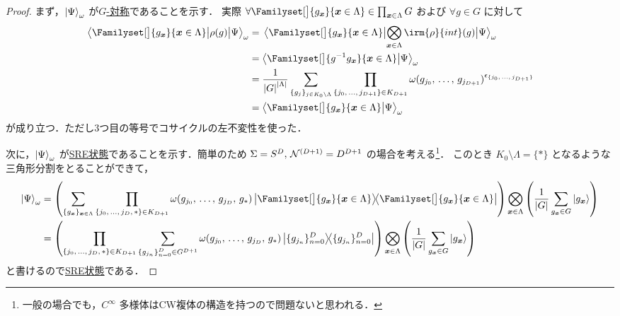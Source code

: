 \documentclass[TQFT_main]{subfiles}
\begin{document}
\begin{proof}
    まず，$\ket{\Psi}_\omega$ が\hyperref[def:blat-G-equiv]{$G$-対称}であることを示す．
    実際 $\forall \Familyset[\big]{g_{\bm{x}}}{\bm{x} \in \Lambda} \in \prod_{\bm{x} \in \Lambda} G$ および $\forall g \in G$ に対して
    \begin{align}
        \mel{\Familyset[\big]{g_{\bm{x}}}{\bm{x} \in \Lambda}}{\rho(g)}{\Psi}_\omega
        &= \mel{\Familyset[\big]{g_{\bm{x}}}{\bm{x} \in \Lambda}}{\bigotimes_{\bm{x} \in \Lambda} \irm{\rho}{int} (g)}{\Psi}_\omega \\
        &= \braket{\Familyset[\big]{g^{-1}g_{\bm{x}}}{\bm{x} \in \Lambda}}{\Psi}_\omega \\
        &= \frac{1}{\abs{G}^{\abs{\Lambda}}} \sum_{\{g_{j}\}_{j \in K_0 \setminus \Lambda}} \prod_{\{j_0,\, \dots,\, j_{D+1}\} \in K_{D+1}} \omega (g_{j_0},\, \dots,\, g_{j_{D+1}})^{\epsilon_{\{j_0,\, \dots,\, j_{D+1}\}}} \\
        &= \braket{\Familyset[\big]{g_{\bm{x}}}{\bm{x} \in \Lambda}}{\Psi}_\omega
    \end{align}
    が成り立つ．ただし3つ目の等号でコサイクルの左不変性を使った．

    次に，$\ket{\Psi}_\omega$ が\hyperref[def:SRE]{SRE状態}であることを示す．簡単のため $\Sigma = S^D,\, \mathcal{N}^{(D+1)} = D^{D+1}$ の場合を考える\footnote{一般の場合でも，$C^\infty$ 多様体はCW複体の構造を持つので問題ないと思われる．}．
    このとき $K_{0} \setminus \Lambda = \{*\}$ となるような三角形分割をとることができて，
    \begin{align}
        \ket{\Psi}_\omega 
        &= \left( \sum_{\{g_{\bm{x}}\}_{\bm{x} \in \Lambda}} \prod_{\{j_0,\, \dots ,\, j_{D},\, *\} \in K_{D+1}} \omega (g_{j_0},\, \dots,\, g_{j_D},\, g_{*}) \ketbra{\Familyset[\big]{g_{\bm{x}}}{\bm{x} \in \Lambda}}{\Familyset[\big]{g_{\bm{x}}}{\bm{x} \in \Lambda}} \right) \bigotimes_{\bm{x} \in \Lambda} \left( \frac{1}{\abs{G}} \sum_{g_{\bm{x}} \in G} \ket{g_{\bm{x}}}\right) \\
        &= \left( \prod_{\{j_0,\, \dots ,\, j_{D},\, *\} \in K_{D+1}} \sum_{\{g_{j_n}\}_{n=0}^D \in G^{D+1}} \omega (g_{j_0},\, \dots,\, g_{j_D},\, g_{*}) \ketbra{\{g_{j_n}\}_{n=0}^D}{\{g_{j_n}\}_{n=0}^D} \right) \bigotimes_{\bm{x} \in \Lambda} \left( \frac{1}{\abs{G}} \sum_{g_{\bm{x}} \in G} \ket{g_{\bm{x}}}\right) 
    \end{align}
    と書けるので\hyperref[def:SRE]{SRE状態}である．


\end{proof}
\end{document}
